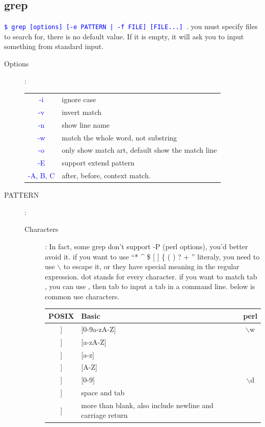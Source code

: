 \documentclass[a4paper,12pt,twoside]{book}
\newcommand{\linuxcommand}[1]{\texttt{\textcolor{blue}{\$ #1 \Pisymbol{psy}{191}}}}
\newcommand{\op}[1]{\textcolor{blue}{-#1}}
\newcommand{\hotkey}[1]{\framebox{#1}}
\begin{document}
\begin{CJK*}{UTF8}{song}
\section{grep}
	\linuxcommand{ grep [options] [-e PATTERN | -f FILE] [FILE...]}. you must specify files to search for, there is no default value. If it is empty, it will ask you to input something from standard input.
	\begin{description}
	\item[Options]: \\
		\begin{tabular}{c|p{}}
		\hline
		\op{i} & ignore case \\
		\op{v} & invert match\\
		\op{n} & show line name\\
		\op{w} & match the whole word, not substring \\
		\op{o} & only show match art, default show the match line\\
		\op{E} & support extend pattern\\
		\op{A, B, C} & after, before, context match.\\
		\hline
		\end{tabular}
	\item[PATTERN]:
		\begin{description}
		\item[Characters]: In fact, some grep don't support -P (perl options), you'd better avoid it. if you want to use ``* \^{} \$ [ ] \{ ( ) ? + '' literaly, you need to use $\backslash$ to escape it, or they have special meaning in the regular expression. dot stands for every character. if you want to match tab , you can use \hotkey{ctrl+v}, then tab to input a tab in a command line. below is common use characters.
		\begin{center}
			\begin{tabular}{|c|p{15em}|c|}
			\hline POSIX & Basic & perl \\
			\hline [[:alnum:]] & [0-9a-zA-Z] & $\backslash$w \\
			\hline [[:alpha:]] & [a-zA-Z] &  \\
			\hline [[:lower:]] & [a-z] &  \\
			\hline [[:upper:]] & [A-Z] &  \\
			\hline [[:digit:]] & [0-9] & $\backslash$d \\
			\hline [[:blank:]] & space and tab &  \\
			\hline [[:space:]] & more than blank, also include newline and carriage return &  \\

\end{tabular}
\end{center}
\end{description}
\end{description}
\end{CJK*}
\end{document}
